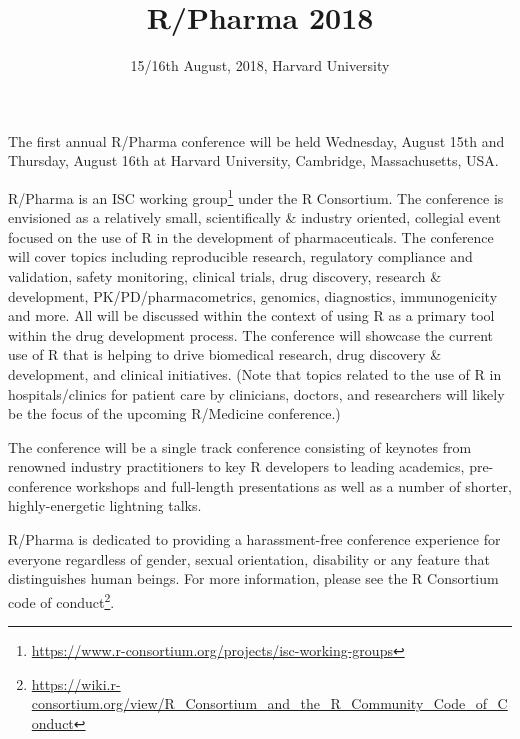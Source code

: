 \documentclass[]{book}
\title{R/Pharma 2018}
\date{15/16th August, 2018, Harvard University}
\renewcommand{\href}[2]{#2\footnote{\url{#1}}}
\theoremstyle{definition}
\theoremstyle{definition}
\theoremstyle{definition}
\theoremstyle{remark}
\begin{document}
\maketitle


\setlength{\abovedisplayskip}{-5pt}
\setlength{\abovedisplayshortskip}{-5pt}

{
\hypersetup{linkcolor=}
\setcounter{tocdepth}{2}
\tableofcontents
}
\listoftables
\listoffigures
\hypertarget{section}{%
\chapter*{}\label{section}}

The first annual R/Pharma conference will be held Wednesday, August 15th
and Thursday, August 16th at Harvard University, Cambridge,
Massachusetts, USA.

R/Pharma is an
\href{https://www.r-consortium.org/projects/isc-working-groups}{ISC
working group} under the R Consortium. The conference is envisioned as a
relatively small, scientifically \& industry oriented, collegial event
focused on the use of R in the development of pharmaceuticals. The
conference will cover topics including reproducible research, regulatory
compliance and validation, safety monitoring, clinical trials, drug
discovery, research \& development, PK/PD/pharmacometrics, genomics,
diagnostics, immunogenicity and more. All will be discussed within the
context of using R as a primary tool within the drug development
process. The conference will showcase the current use of R that is
helping to drive biomedical research, drug discovery \& development, and
clinical initiatives. (Note that topics related to the use of R in
hospitals/clinics for patient care by clinicians, doctors, and
researchers will likely be the focus of the upcoming R/Medicine
conference.)

The conference will be a single track conference consisting of keynotes
from renowned industry practitioners to key R developers to leading
academics, pre-conference workshops and full-length presentations as
well as a number of shorter, highly-energetic lightning talks.

R/Pharma is dedicated to providing a harassment-free conference
experience for everyone regardless of gender, sexual orientation,
disability or any feature that distinguishes human beings. For more
information, please see the
\href{https://wiki.r-consortium.org/view/R_Consortium_and_the_R_Community_Code_of_Conduct}{R
Consortium code of conduct}.
\end{document}
